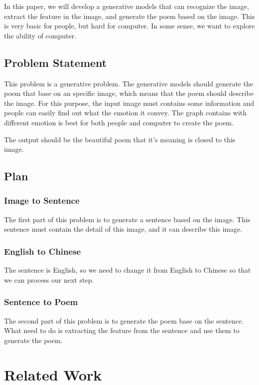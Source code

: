 \documentclass[10pt,twocolumn,letterpaper]{article}
\begin{document}
In this paper, we will develop a generative models that can recognize the image, extract the feature in the image, and generate the poem based on the image. This is very basic for people, but hard for computer. In some sense, we want to explore the ability of computer.
\subsection{Problem Statement}
This problem is a generative problem. The generative models should generate the poem that base on an specific image, which means that the poem should describe the image. For this purpose, the input image must contains some information and people can easily find out what the emotion it convey. The graph contains with different emotion is best for both people and computer to create the poem.

The output should be the beautiful poem that it's meaning is closed to this image.

\subsection{Plan}
\subsubsection{Image to Sentence}
The first part of this problem is to generate a sentence based on the image. This sentence must contain the detail of this image, and it can describe this image.
\subsubsection{English to Chinese}
The sentence is English, so we need to change it from English to Chinese so that we can process our next step.
\subsubsection{Sentence to Poem}
The second part of this problem is to generate the poem base on the sentence. What need to do is extracting the feature from the sentence and use them to generate the poem.

\section{Related Work}




\end{document}
